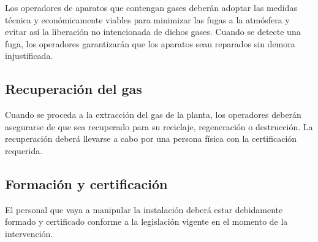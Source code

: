 \documentclass[../main.tex]{subfiles}
\begin{document}
Los operadores de aparatos que contengan gases deberán adoptar las medidas técnica y económicamente viables para minimizar las fugas a la atmósfera y evitar así la liberación no intencionada de dichos gases. Cuando se detecte una fuga, los operadores garantizarán que los aparatos sean reparados sin demora injustificada.

\subsection{Recuperación del gas}

Cuando se proceda a la extracción del gas de la planta, los operadores deberán asegurarse de que sea recuperado para su reciclaje, regeneración o destrucción. La recuperación deberá llevarse a cabo por una persona física con la certificación requerida.

\subsection{Formación y certificación}

El personal que vaya a manipular la instalación deberá estar debidamente formado y certificado conforme a la legislación vigente en el momento de la intervención.
\end{document}

